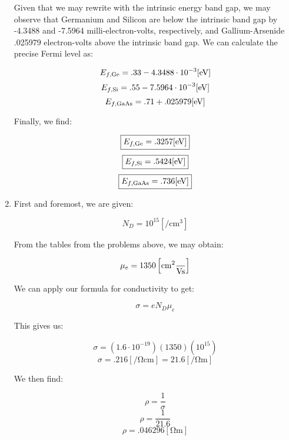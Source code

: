 \begin{enumerate}
    Given that we may rewrite with the intrinsic energy band gap, we may observe that Germanium and Silicon are below the intrinsic band gap by -4.3488 and -7.5964 milli-electron-volts, respectively, and Gallium-Arsenide .025979 electron-volts above the intrinsic band gap. We can calculate the precise Fermi level as:

    $$E_{f,\ce{Ge}}=.33-4.3488\cdot10^{-3}[\si{eV}]$$
    $$E_{f,\ce{Si}}=.55-7.5964\cdot10^{-3}[\si{eV}]$$
    $$E_{f,\ce{GaAs}}=.71+.025979[\si{eV}]$$

    Finally, we find:

    $$\boxed{E_{f,\ce{Ge}}=.3257[\si{eV}]}$$
    $$\boxed{E_{f,\ce{Si}}=.5424[\si{eV}]}$$
    $$\boxed{E_{f,\ce{GaAs}}=.736[\si{eV}]}$$

  \item First and foremost, we are given:

    $$N_D=10^{15}[\si{\per\centi\meter\cubed}]$$

    From the tables from the problems above, we may obtain:

    $$\mu_e=1350\left[\si{\centi\meter\squared\over\volt\second}\right]$$

    We can apply our formula for conductivity to get:

    $$\sigma=eN_D\mu_e$$

    This gives us:

    $$\sigma=(1.6\cdot10^{-19})(1350)(10^{15})$$
    $$\boxed{\sigma=.216[\si{\per\ohm\centi\meter}]=21.6[\si{\per\ohm\meter}]}$$

    We then find:

    $$\rho=\frac{1}{\sigma}$$
    $$\rho=\frac{1}{21.6}$$
    $$\boxed{\rho=.046296[\si{\ohm\meter}]}$$

\end{enumerate}



